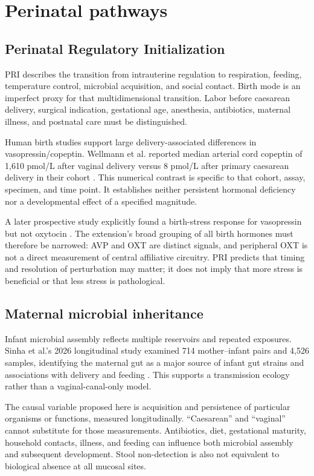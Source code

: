 \section{Perinatal pathways}

\subsection{Perinatal Regulatory Initialization}

PRI describes the transition from intrauterine regulation to respiration, feeding, temperature control, microbial acquisition, and social contact. Birth mode is an imperfect proxy for that multidimensional transition. Labor before caesarean delivery, surgical indication, gestational age, anesthesia, antibiotics, maternal illness, and postnatal care must be distinguished.

Human birth studies support large delivery-associated differences in vasopressin/copeptin. Wellmann et al. reported median arterial cord copeptin of 1,610 pmol/L after vaginal delivery versus 8 pmol/L after primary caesarean delivery in their cohort \cite{ref1}. This numerical contrast is specific to that cohort, assay, specimen, and time point. It establishes neither persistent hormonal deficiency nor a developmental effect of a specified magnitude.

A later prospective study explicitly found a birth-stress response for vasopressin but not oxytocin \cite{ref2}. The extension's broad grouping of all birth hormones must therefore be narrowed: AVP and OXT are distinct signals, and peripheral OXT is not a direct measurement of central affiliative circuitry. PRI predicts that timing and resolution of perturbation may matter; it does not imply that more stress is beneficial or that less stress is pathological.


\subsection{Maternal microbial inheritance}

Infant microbial assembly reflects multiple reservoirs and repeated exposures. Sinha et al.'s 2026 longitudinal study examined 714 mother–infant pairs and 4,526 samples, identifying the maternal gut as a major source of infant gut strains and associations with delivery and feeding \cite{ref3}. This supports a transmission ecology rather than a vaginal-canal-only model.

The causal variable proposed here is acquisition and persistence of particular organisms or functions, measured longitudinally. “Caesarean” and “vaginal” cannot substitute for those measurements. Antibiotics, diet, gestational maturity, household contacts, illness, and feeding can influence both microbial assembly and subsequent development. Stool non-detection is also not equivalent to biological absence at all mucosal sites.

